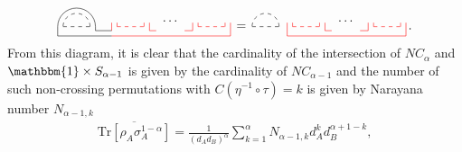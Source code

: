 \documentclass[a4paper,11pt]{article}
\newcommand{\Tr}{\text{Tr}}
\begin{document}
\begin{align}
    \tikz[scale=0.75,baseline=-0.5ex]{
    \draw[dashed] (0,0) -- (1,0);
    \draw (-0.2,0.)-- (-0.2,-0.35);
    \draw (1.2,-0.15)-- (1.2,0.);
    \draw[dashed,red] (2,0) -- (3,0);
    \draw[red] (2,0)-- (2,0.15);
    \draw[red] (3,0)-- (3,0.15);
    \draw[red] (1.8,-.15)-- (1.8,0.15);
    \draw[red] (3.2,-0.15)-- (3.2,0.15);
    \draw[dashed,red] (5,0) -- (6,0);
    \draw[red] (5,0)-- (5,0.15);
    \draw[red] (6,0)-- (6,0.15);
    \draw[red] (4.8,0.15)-- (4.8,-0.15);
    \draw[red] (6.2,-0.35)-- (6.2,0.15);
    \draw (1.2,-0.15)--(1.8,-0.15);
    \draw[red] (3.2,-0.15)--(3.45,-0.15);
    \draw[black] (-0.2,-0.35)-- (1.8,-0.35);
    \draw[red] (1.8,-0.35)-- (6.2,-0.35);
    \draw[red] (4.5,-0.15)--(4.8,-0.15);
    \node[] at (4.,0.2) {$\cdots$};
    \draw[dashed] (1.0,0) arc (0:180:0.5);
    \draw (1.2,0) arc (0:180:0.7);
    } 
    \,
    =
    \,
    \tikz[scale=0.75,baseline=-0.5ex]{
    \draw[dashed] (0.5,0) -- (1.5,0);
    \draw[dashed,red] (2,0) -- (3,0);
    \draw[red] (2,0)-- (2,0.15);
    \draw[red] (3,0)-- (3,0.15);
    \draw[red] (1.8,-.35)-- (1.8,0.15);
    \draw[red] (3.2,-0.15)-- (3.2,0.15);
    \draw[dashed,red] (5,0) -- (6,0);
    \draw[red] (5,0)-- (5,0.15);
    \draw[red] (6,0)-- (6,0.15);
    \draw[red] (4.8,0.15)-- (4.8,-0.15);
    \draw[red] (6.2,-0.35)-- (6.2,0.15);
    \draw[red] (3.2,-0.15)--(3.45,-0.15);
    \draw[red] (1.8,-0.35)-- (6.2,-0.35);
    \draw[red] (4.5,-0.15)--(4.8,-0.15);
    \node[] at (4.,0.2) {$\cdots$};
    \draw[dashed] (1.5,0) arc (0:180:0.5);
    } \, .
\end{align}
From this diagram, it is clear that the cardinality of the intersection of $NC_{\alpha}$ and $\mathbbm{1}\times S_{\alpha - 1}$ is given by the cardinality of $NC_{\alpha-1}$ and the number of such non-crossing permutations with $C(\eta^{-1}\circ \tau) = k$ is given by Narayana number $N_{\alpha-1,k}$
\begin{align}
    \overline{\Tr\left[ \rho_A \sigma_A^{1-\alpha}\right]} =\frac{1}{(d_A d_B)^{\alpha}} \sum_{k= 1}^{\alpha} N_{{\alpha}-1,k} d_A^{k} d_B^{{\alpha}+1-k},
    \label{narayana_sum_rel}
\end{align}
\end{document}
